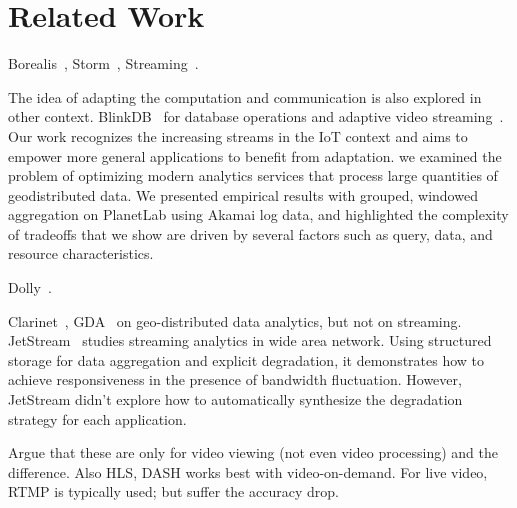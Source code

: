 \section{Related Work}
\label{sec:related-work}

 Borealis~\cite{abadi2005design},
Storm~\cite{toshniwal2014storm}, Streaming~\cite{zaharia2012discretized}.

 The idea of adapting the computation and
communication is also explored in other
context. BlinkDB~\cite{agarwal2013blinkdb} for database operations and adaptive
video streaming~\cite{yin2015control}. Our work recognizes the increasing
streams in the IoT context and aims to empower more general applications to
benefit from adaptation. \cite{heintz2015towards} we examined the problem of
optimizing modern analytics services that process large quantities of
geodistributed data. We presented empirical results with grouped, windowed
aggregation on PlanetLab using Akamai log data, and highlighted the complexity
of tradeoffs that we show are driven by several factors such as query, data, and
resource characteristics.

 Dolly~\cite{ananthanarayanan2013effective}.

 Clarinet~\cite{viswanathan2016clarinet}, GDA~\cite{pu2015low}
on geo-distributed data analytics, but not on
streaming. JetStream~\cite{rabkin2014aggregation} studies streaming analytics in
wide area network. Using structured storage for data aggregation and explicit
degradation, it demonstrates how to achieve responsiveness in the presence of
bandwidth fluctuation. However, JetStream didn't explore how to automatically
synthesize the degradation strategy for each application.

 Argue that these are only for video viewing (not even
video processing) and the difference. Also HLS, DASH works best with
video-on-demand. For live video, RTMP is typically used; but suffer the accuracy
drop.


